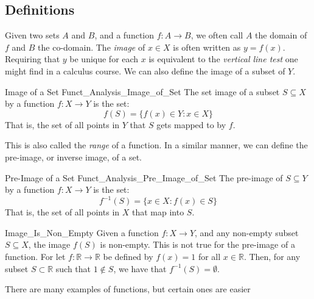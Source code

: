     \subsection{Definitions}
        Given two sets $A$ and $B$, and a function
        $f:A\rightarrow{B}$, we often call $A$ the
        domain of $f$ and $B$ the co-domain.
        The \textit{image} of $x\in{X}$ is often written
        as $y=f(x)$. Requiring that $y$ be unique for each
        $x$ is equivalent to the \textit{vertical line test}
        one might find in a calculus course. We can also
        define the image of a subset of $Y$.
        \begin{ldefinition}{Image of a Set}
              {Funct_Analysis_Image_of_Set}
            The \gls{set image} of a subset
            $S\subseteq{X}$ by a function
            $f:X\rightarrow{Y}$ is the set:
            \begin{equation}
                f(S)=\{f(x)\in{Y}:x\in{X}\}
            \end{equation}
            That is, the set of all points in $Y$ that $S$
            gets mapped to by $f$.
        \end{ldefinition}
        This is also called the \textit{range} of a function.
        In a similar manner, we can define the pre-image, or
        inverse image, of a set.
        \begin{ldefinition}{Pre-Image of a Set}
              {Funct_Analysis_Pre_Image_of_Set}
            The \gls{pre-image} of $S\subseteq{Y}$
            by a function $f:X\rightarrow{Y}$ is the set:
            \begin{equation}
                f^{\minus{1}}(S)=\{x\in{X}:f(x)\in{S}\}
            \end{equation}
            That is, the set of all points in $X$ that map
            into $S$.
        \end{ldefinition}
        \begin{lexample}{}{Image_Is_Non_Empty}
            Given a function $f:X\rightarrow{Y}$, and any non-empty subset
            $S\subseteq{X}$, the image $f(S)$ is non-empty. This is not
            true for the pre-image of a function. For let
            $f:\mathbb{R}\rightarrow\mathbb{R}$ be defined by $f(x)=1$ for
            all $x\in\mathbb{R}$. Then, for any subset $S\subset\mathbb{R}$
            such that $1\notin{S}$, we have that
            $f^{\minus{1}}(S)=\emptyset$.
        \end{lexample}
        There are many examples of functions, but certain ones are easier
